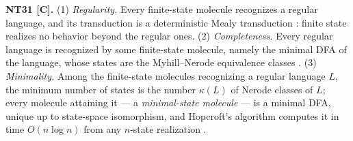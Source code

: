 \begin{theorem}\label{nt:31}
\textbf{NT31 [C].} (1) \emph{Regularity.} Every finite-state molecule
recognizes a regular language, and its transduction is a deterministic Mealy
transduction \cite{mealy}: finite state realizes no behavior beyond the
regular ones.
(2) \emph{Completeness.} Every regular language is recognized by some
finite-state molecule, namely the minimal DFA of the language, whose states
are the Myhill--Nerode equivalence classes \cite{nerode}.
(3) \emph{Minimality.} Among the finite-state molecules recognizing a regular
language $L$, the minimum number of states is the number $\kappa(L)$ of Nerode
classes of $L$; every molecule attaining it --- a \emph{minimal-state
molecule} --- is a minimal DFA, unique up to state-space isomorphism, and
Hopcroft's algorithm computes it in time $O(n \log n)$ from any $n$-state
realization \cite{hopcroft}.
\end{theorem}

